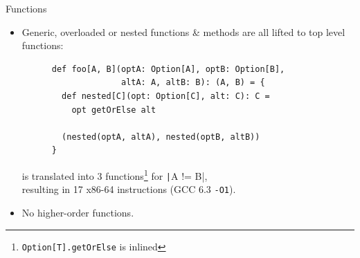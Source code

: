 \documentclass[xcolor={usenames,dvipsnames}]{beamer}
\newcommand{\Inline}[1]{\texttt{#1}}
\newcommand{\InlineS}[1]{\texttt|#1|}
\begin{document}
\begin{frame}[fragile]{Functions}

  \begin{itemize}

    \item Generic, overloaded or nested functions \& methods are all lifted to top level functions:
      \begin{verbatim}
      def foo[A, B](optA: Option[A], optB: Option[B],
                    altA: A, altB: B): (A, B) = {
        def nested[C](opt: Option[C], alt: C): C =
          opt getOrElse alt

        (nested(optA, altA), nested(optB, altB))
      }
      \end{verbatim}
      is translated into 3 functions\footnote{\Inline{Option[T].getOrElse} is inlined} for \InlineS{A != B},\\
      resulting in 17 x86-64 instructions (GCC 6.3 \Inline{-O1}).

    \pause \vfill

    \item \alert{No higher-order functions.}

  \end{itemize}



\end{frame}
\end{document}
